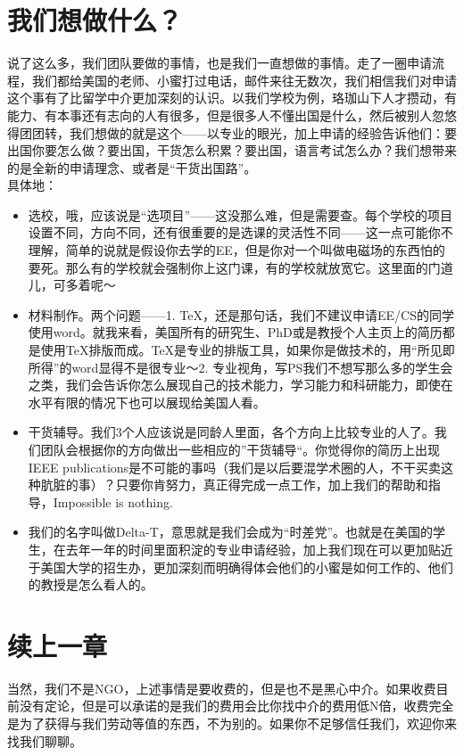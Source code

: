 \documentclass{article}
\begin{document}
\section{我们想做什么？}
说了这么多，我们团队要做的事情，也是我们一直想做的事情。走了一圈申请流程，我们都给美国的老师、小蜜打过电话，邮件来往无数次，我们相信我们对申请这个事有了比留学中介更加深刻的认识。以我们学校为例，珞珈山下人才攒动，有能力、有本事还有志向的人有很多，但是很多人不懂出国是什么，然后被别人忽悠得团团转，我们想做的就是这个——以专业的眼光，加上申请的经验告诉他们：要出国你要怎么做？要出国，干货怎么积累？要出国，语言考试怎么办？我们想带来的是全新的申请理念、或者是“干货出国路”。\\

具体地：
\begin{itemize}
\item{选校，哦，应该说是“选项目”——这没那么难，但是需要查。每个学校的项目设置不同，方向不同，还有很重要的是选课的灵活性不同——这一点可能你不理解，简单的说就是假设你去学的EE，但是你对一个叫做电磁场的东西怕的要死。那么有的学校就会强制你上这门课，有的学校就放宽它。这里面的门道儿，可多着呢～}

\item{材料制作。两个问题——1. TeX，还是那句话，我们不建议申请EE/CS的同学使用word。就我来看，美国所有的研究生、PhD或是教授个人主页上的简历都是使用TeX排版而成。TeX是专业的排版工具，如果你是做技术的，用“所见即所得”的word显得不是很专业～2. 专业视角，写PS我们不想写那么多的学生会之类，我们会告诉你怎么展现自己的技术能力，学习能力和科研能力，即使在水平有限的情况下也可以展现给美国人看。}

\item{干货辅导。我们3个人应该说是同龄人里面，各个方向上比较专业的人了。我们团队会根据你的方向做出一些相应的”干货辅导“。你觉得你的简历上出现IEEE publications是不可能的事吗（我们是以后要混学术圈的人，不干买卖这种肮脏的事）？只要你肯努力，真正得完成一点工作，加上我们的帮助和指导，Impossible is nothing.}

\item{我们的名字叫做Delta-T，意思就是我们会成为“时差党”。也就是在美国的学生，在去年一年的时间里面积淀的专业申请经验，加上我们现在可以更加贴近于美国大学的招生办，更加深刻而明确得体会他们的小蜜是如何工作的、他们的教授是怎么看人的。}
\end{itemize}

\section{续上一章}
当然，我们不是NGO，上述事情是要收费的，但是也不是黑心中介。如果收费目前没有定论，但是可以承诺的是我们的费用会比你找中介的费用低N倍，收费完全是为了获得与我们劳动等值的东西，不为别的。如果你不足够信任我们，欢迎你来找我们聊聊。\\
 
\end{document}
